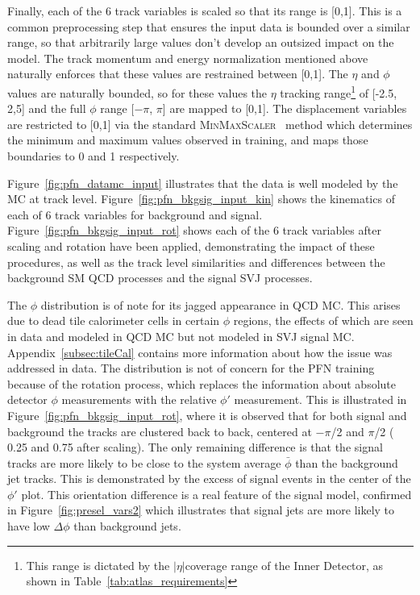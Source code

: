 Finally, each of the 6 track variables is scaled so that its range is [0,1]. This is a common preprocessing step that ensures the input data is bounded over a similar range, so that arbitrarily large values don't develop an outsized impact on the model. The track momentum and energy normalization mentioned above naturally enforces that these values are restrained between [0,1]. The $\eta$ and $\phi$ values are naturally bounded, so for these values the $\eta$ tracking range\footnote{This range is dictated by the $|\eta|$coverage range of the Inner Detector, as shown in Table~\ref{tab:atlas_requirements}} of [-2.5, 2,5] and the full $\phi$ range [$-\pi$, $\pi$] are mapped to [0,1]. The displacement variables are restricted to [0,1] via the standard \textsc{MinMaxScaler}~\cite{scikit-learn} method which determines the minimum and maximum values observed in training, and maps those boundaries to 0 and 1 respectively. \par

Figure~\ref{fig:pfn_datamc_input} illustrates that the data is well modeled by the MC at track level. Figure~\ref{fig:pfn_bkgsig_input_kin} shows the kinematics of each of 6 track variables for background and signal. Figure~\ref{fig:pfn_bkgsig_input_rot} shows each of the 6 track variables after scaling and rotation have been applied, demonstrating the impact of these procedures, as well as the track level similarities and differences between the background SM QCD processes and the signal SVJ processes. \par

The $\phi$ distribution is of note for its jagged appearance in QCD MC. This arises due to dead tile calorimeter cells in certain $\phi$ regions, the effects of which are seen in data and modeled in QCD MC but not modeled in SVJ signal MC. Appendix~\ref{subsec:tileCal} contains more information about how the issue was addressed in data. The distribution is not of concern for the PFN training because of the rotation process, which replaces the information about absolute detector $\phi$ measurements with the relative $\phi'$ measurement. This is illustrated in Figure~\ref{fig:pfn_bkgsig_input_rot}, where it is observed that for both signal and background the tracks are clustered back to back, centered at $-\pi$/2 and $\pi$/2 ( 0.25 and 0.75 after scaling). The only remaining difference is that the signal tracks are more likely to be close to the system average $\bar{\phi}$ than the background jet tracks. This is demonstrated by the excess of signal events in the center of the $\phi'$ plot. This orientation difference is a real feature of the signal model, confirmed in Figure~\ref{fig:presel_vars2} which illustrates that signal jets are more likely to have low $\Delta\phi$ than background jets. 

